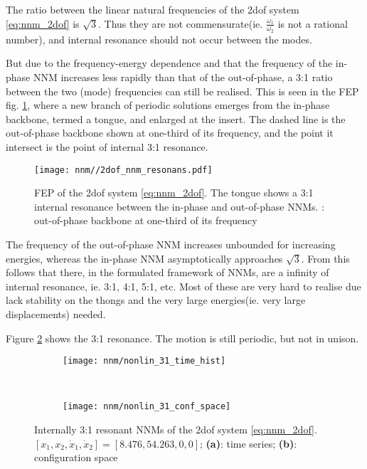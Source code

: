 The ratio between the linear natural frequencies of the 2dof system
\eqref{eq:nnm_2dof} is $\sqrt{3}$. Thus they
are not commensurate(ie. $\frac{\omega_1}{\omega_2}$ is not a rational number),
and internal resonance should not occur between the modes.

But due to the frequency-energy dependence and that the frequency of the
in-phase NNM increases less rapidly than that of the out-of-phase, a 3:1 ratio
between the two (mode) frequencies can still be realised. This is seen in the
FEP fig. \ref{fig:nnm_fep_resonance}, where a new branch of periodic solutions
emerges from the in-phase backbone, termed a tongue, and enlarged at the insert.
The dashed line is the out-of-phase backbone shown at one-third of its
frequency, and the point it intersect is the point of internal 3:1 resonance.

\begin{figure}[!ht]
  \centering
  \texttt{[image: nnm//2dof\_nnm\_resonans.pdf]}
  \caption{FEP of the 2dof system \eqref{eq:nnm_2dof}. The tongue shows a 3:1
    internal resonance between the in-phase and out-of-phase NNMs.
    : out-of-phase backbone at one-third of its frequency}
  \label{fig:nnm_fep_resonance}
\end{figure}


The frequency of the out-of-phase NNM increases unbounded for increasing
energies, whereas the in-phase NNM asymptotically approaches $\sqrt{3}$. From
this follows that there, in the formulated framework of NNMs, are a infinity of
internal resonance, ie. 3:1, 4:1, 5:1, etc. Most of these are very hard to
realise due lack stability on the thongs and the very large energies(ie. very
large displacements) needed.


Figure \ref{fig:nnm_3:1_resonance} shows the 3:1 resonance. The motion is still
periodic, but not in unison.

\begin{figure}[!ht]
  \centering
  \begin{subfigure}[b]{0.45\textwidth}
    \texttt{[image: nnm/nonlin\_31\_time\_hist]}
  \end{subfigure}
  ~
  \begin{subfigure}[b]{0.45\textwidth}
    \texttt{[image: nnm/nonlin\_31\_conf\_space]}
  \end{subfigure}
  \caption{Internally 3:1 resonant NNMs of the 2dof system \eqref{eq:nnm_2dof}.
    $[x_1, x_2, \dot x_1, \dot x_2] = [8.476, 54.263, 0, 0]$;
    \textbf{(a)}: time series;
    \textbf{(b)}: configuration space}
  \label{fig:nnm_3:1_resonance}
\end{figure}


